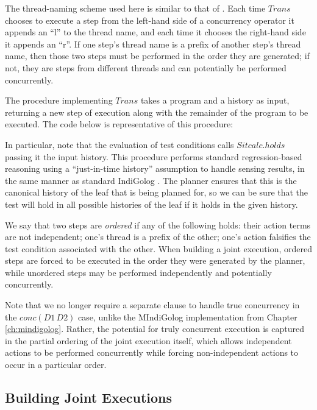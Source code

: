 The thread-naming scheme used here is similar to that of \citep{fritz08congolog_sin_trans}.
Each time $Trans$ chooses to execute a step from the left-hand side
of a concurrency operator it appends an {}``l'' to the thread name,
and each time it chooses the right-hand side it appends an {}``r''.
If one step's thread name is a prefix of another step's thread name,
then those two steps must be performed in the order they are generated;
if not, they are steps from different threads and can potentially
be performed concurrently.

The procedure implementing $Trans$ takes a program and a history
as input, returning a new step of execution along with the remainder
of the program to be executed. The code below is representative of
this procedure:


In particular, note that the evaluation of test conditions calls $Sitcalc.holds$
passing it the input history. This procedure performs standard regression-based
reasoning using a {}``just-in-time history'' assumption to handle
sensing results, in the same manner as standard IndiGolog \citep{giacomo99indigolog}.
The planner ensures that this is the canonical history of the leaf
that is being planned for, so we can be sure that the test will hold
in all possible histories of the leaf if it holds in the given history.

We say that two steps are \emph{ordered} if any of the following holds:
their action terms are not independent; one's thread is a prefix of
the other; one's action falsifies the test condition associated with
the other. When building a joint execution, ordered steps are forced
to be executed in the order they were generated by the planner, while
unordered steps may be performed independently and potentially concurrently.

Note that we no longer require a separate clause to handle true concurrency
in the $conc(D1\, D2)$ case, unlike the MIndiGolog implementation
from Chapter \ref{ch:mindigolog}. Rather, the potential for truly
concurrent execution is captured in the partial ordering of the joint
execution itself, which allows independent actions to be performed
concurrently while forcing non-independent actions to occur in a particular
order.


\subsection{Building Joint Executions}

